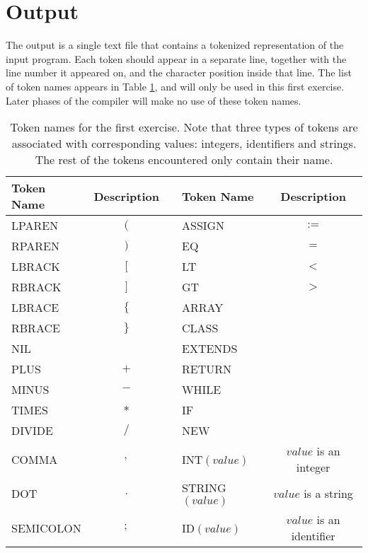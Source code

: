 \documentclass{article}
\begin{document}
\section{Output}
The output is a single text file that contains a tokenized representation of the input program.
Each token should appear in a separate line, together with the line number
it appeared on, and the character position inside that line.
The list of token names appears in Table \ref{Table_Token_Names_For_Exercise_1},
and will only be used in this first exercise.
Later phases of the compiler will make no use of these token names.
\begin{table}[h]
\centering
\begin{tabular}{|l|c|c|l|c|}
\hline
Token Name & Description & & Token Name & Description \\
\hline
\hline
LPAREN    & $($  & & ASSIGN           & $:=$                     \\
RPAREN    & $)$  & & EQ               & $=$                      \\
LBRACK    & $[$  & & LT               & $<$                      \\
RBRACK    & $]$  & & GT               & $>$                      \\
LBRACE    & $\{$ & & ARRAY            &                          \\
RBRACE    & $\}$ & & CLASS            &                          \\
NIL       &      & & EXTENDS          &                          \\
PLUS      & $+$  & & RETURN           &                          \\
MINUS     & $-$  & & WHILE            &                          \\
TIMES     & $*$  & & IF               &                          \\
DIVIDE    & $/$  & & NEW              &                          \\
COMMA     & $,$  & & INT$(value)$     & $value$ is an integer    \\
DOT       & $.$  & & STRING$(value)$  & $value$ is a string      \\
SEMICOLON & $;$  & & ID$(value)$      & $value$ is an identifier \\
\hline
\end{tabular}
\caption{
Token names for the first exercise.
Note that three types of tokens are associated with corresponding values:
integers, identifiers and strings.
The rest of the tokens encountered only contain their name.
\label{Table_Token_Names_For_Exercise_1}}
\end{table}
\end{document}
